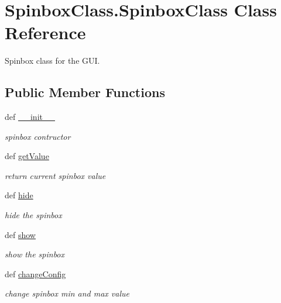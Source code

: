 \hypertarget{classSpinboxClass_1_1SpinboxClass}{\section{Spinbox\+Class.\+Spinbox\+Class Class Reference}
\label{classSpinboxClass_1_1SpinboxClass}
}


Spinbox class for the G\+U\+I.  


\subsection*{Public Member Functions}
\begin{DoxyCompactItemize}
\item 
def \hyperlink{classSpinboxClass_1_1SpinboxClass_a8021362d4589716bbed55488d1da94ed}{\+\_\+\+\_\+init\+\_\+\+\_\+}
\begin{DoxyCompactList}\small\item\em spinbox contructor \end{DoxyCompactList}\item 
\hypertarget{classSpinboxClass_1_1SpinboxClass_a2a99fbbf8e719ffbad746134cac7f860}{def \hyperlink{classSpinboxClass_1_1SpinboxClass_a2a99fbbf8e719ffbad746134cac7f860}{get\+Value}}\label{classSpinboxClass_1_1SpinboxClass_a2a99fbbf8e719ffbad746134cac7f860}

\begin{DoxyCompactList}\small\item\em return current spinbox value \end{DoxyCompactList}\item 
\hypertarget{classSpinboxClass_1_1SpinboxClass_abf54b6a4c6498d32d8591a626445e52f}{def \hyperlink{classSpinboxClass_1_1SpinboxClass_abf54b6a4c6498d32d8591a626445e52f}{hide}}\label{classSpinboxClass_1_1SpinboxClass_abf54b6a4c6498d32d8591a626445e52f}

\begin{DoxyCompactList}\small\item\em hide the spinbox \end{DoxyCompactList}\item 
\hypertarget{classSpinboxClass_1_1SpinboxClass_a918fdc6e0280b4e18a21833defe4ef3f}{def \hyperlink{classSpinboxClass_1_1SpinboxClass_a918fdc6e0280b4e18a21833defe4ef3f}{show}}\label{classSpinboxClass_1_1SpinboxClass_a918fdc6e0280b4e18a21833defe4ef3f}

\begin{DoxyCompactList}\small\item\em show the spinbox \end{DoxyCompactList}\item 
\hypertarget{classSpinboxClass_1_1SpinboxClass_a2043bd043f12dece33c4b26c163a0078}{def \hyperlink{classSpinboxClass_1_1SpinboxClass_a2043bd043f12dece33c4b26c163a0078}{change\+Config}}\label{classSpinboxClass_1_1SpinboxClass_a2043bd043f12dece33c4b26c163a0078}

\begin{DoxyCompactList}\small\item\em change spinbox min and max value \end{DoxyCompactList}\end{DoxyCompactItemize}

